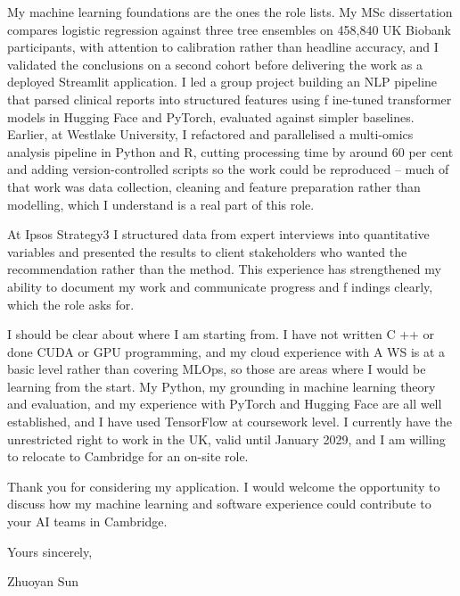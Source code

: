 \documentclass[letterpaper,11pt]{article}
\begin{document}
My machine learning foundations are the ones the role lists. My MSc dissertation compares logistic regression against three tree ensembles on 458,840 UK Biobank participants, with attention to calibration rather than headline accuracy, and I validated the conclusions on a second cohort before delivering the work as a deployed Streamlit application. I led a group project building an NLP pipeline that parsed clinical reports into structured features using f\kern0pt ine-tuned transformer models in Hugging Face and PyTorch, evaluated against simpler baselines. Earlier, at Westlake University, I refactored and parallelised a multi-omics analysis pipeline in Python and R, cutting processing time by around 60 per cent and adding version-controlled scripts so the work could be reproduced -- much of that work was data collection, cleaning and feature preparation rather than modelling, which I understand is a real part of this role.

At Ipsos Strategy3 I structured data from expert interviews into quantitative variables and presented the results to client stakeholders who wanted the recommendation rather than the method. This experience has strengthened my ability to document my work and communicate progress and f\kern0pt indings clearly, which the role asks for.

I should be clear about where I am starting from. I have not written C\kern0pt ++ or done CUDA or GPU programming, and my cloud experience with A\kern0pt WS is at a basic level rather than covering MLOps, so those are areas where I would be learning from the start. My Python, my grounding in machine learning theory and evaluation, and my experience with PyTorch and Hugging Face are all well established, and I have used TensorFlow at coursework level. I currently have the unrestricted right to work in the UK, valid until January 2029, and I am willing to relocate to Cambridge for an on-site role.

Thank you for considering my application. I would welcome the opportunity to discuss how my machine learning and software experience could contribute to your AI teams in Cambridge.

\vspace{2pt}
Yours sincerely,

\vspace{8pt}
Zhuoyan Sun
\end{document}
